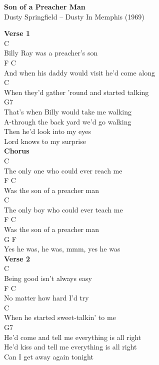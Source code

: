 \documentclass[a4paper]{article}
\begin{document}
    \begin{center}
        \textbf{Son of a Preacher Man}
        ~\\
        Dusty Springfield -- Dusty In Memphis (1969)
    \end{center}
    {
        \scriptsize
        \textbf{Verse 1}
        ~\\
        {
            \cutive
            \obeyspaces
C
\\
Billy Ray was a preacher's son
\\
             F                      C
\\
And when his daddy would visit he'd come along
\\
C
\\
When they'd gather 'round and started talking
\\
G7
\\
That's when Billy would take me walking
\\
A-through the back yard we'd go walking
\\
Then he'd look into my eyes
\\
Lord knows to my surprise
\\

        }
        \textbf{Chorus}
        ~\\
        {
            \cutive
            \obeyspaces
    C
\\
The only one who could ever reach me
\\
F                    C
\\
  Was the son of a preacher man
\\
    C
\\
The only boy who could ever teach me
\\
F                    C
\\
  Was the son of a preacher man
\\
                G    F
\\
Yes he was, he was,  mmm, yes he was
\\

        }
        \textbf{Verse 2}
        ~\\
        {
            \cutive
            \obeyspaces
C
\\
Being good isn't always easy
\\
F             C
\\
No matter how hard I'd try
\\
C
\\
When he started sweet-talkin' to me
\\
G7
\\
He'd come and tell me everything is all right
\\
He'd kiss and tell me everything is all right
\\
Can I get away again tonight
\\

}}
\end{document}
